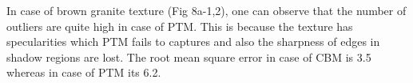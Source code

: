 In case of brown granite texture (Fig 8a-1,2), one can observe that the number
of outliers are quite high in case of PTM. This is because the texture has
specularities which PTM fails to captures and also the sharpness of edges in
shadow regions are lost. The root mean square error in case of CBM is 3.5 whereas in case of PTM its 6.2. 
\begin{figure}[t]
\centering
{}


\end{figure}
